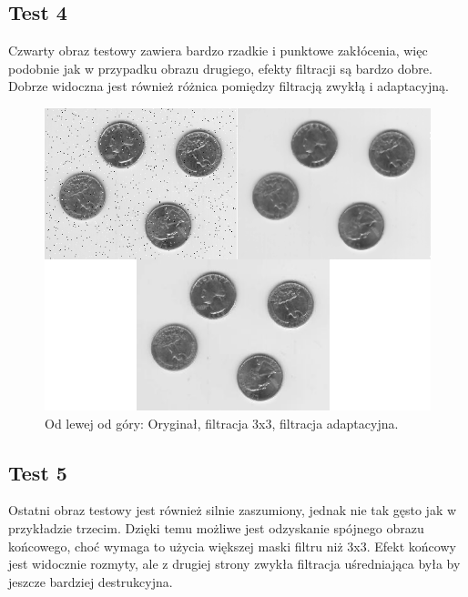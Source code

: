 \documentclass[a4paper,12pt,oneside,notitlepage,onecolumn]{article}
\begin{document}
\subsection{Test 4}
Czwarty obraz testowy zawiera bardzo rzadkie i punktowe zakłócenia, więc podobnie jak w przypadku obrazu drugiego, efekty filtracji są bardzo dobre.
Dobrze widoczna jest również różnica pomiędzy filtracją zwykłą i adaptacyjną.
\begin{figure}
\centering
\includegraphics[width=13cm]{test4_final.png}
\caption{Od lewej od góry: Oryginał, filtracja 3x3, filtracja adaptacyjna.}
\end{figure}

\subsection{Test 5}
Ostatni obraz testowy jest również silnie zaszumiony, jednak nie tak gęsto jak w przykładzie trzecim.
Dzięki temu możliwe jest odzyskanie spójnego obrazu końcowego, choć wymaga to użycia większej maski filtru niż 3x3.
Efekt końcowy jest widocznie rozmyty, ale z drugiej strony zwykła filtracja uśredniająca była by jeszcze bardziej destrukcyjna.
\end{document}
